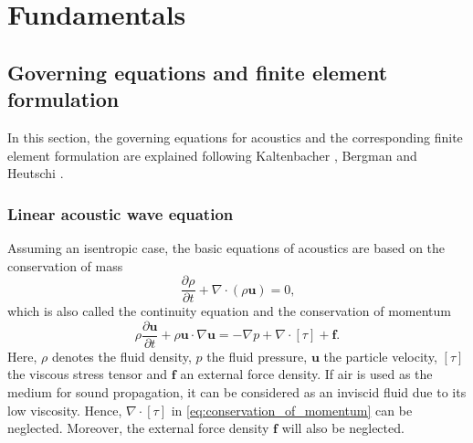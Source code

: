 \chapter{Fundamentals}
\label{chap:Theory}

\section{Governing equations and finite element formulation}

In this section, the governing equations for acoustics and the corresponding finite element formulation are explained following Kaltenbacher \cite{kaltenbacher_numerical_2007, kaltenbacher_computational_2018}, Bergman \cite{bergman_computational_2018} and Heutschi \cite{heutschi_lecture_2016}. %

\subsection*{Linear acoustic wave equation}
 Assuming an isentropic case, the basic equations of acoustics are based on the conservation of mass
\begin{equation}
	\frac{\partial \rho}{\partial t} + \nabla \cdot (\rho \boldsymbol{u}) = 0\text{,} \label{eq:conservation_of_mass}
\end{equation}
which is also called the continuity equation and the conservation of momentum
\begin{equation}
	\rho\frac{\partial \boldsymbol{u}}{\partial t} + \rho \boldsymbol{u}\cdot\nabla\boldsymbol{u} = -\nabla p + \nabla\cdot\left[\tau\right] + \boldsymbol{f}\text{.} \label{eq:conservation_of_momentum}
\end{equation}
Here, $\rho$ denotes the fluid density, $p$ the fluid pressure, $\boldsymbol{u}$ the particle velocity, $\left[\tau\right]$ the viscous stress tensor and $\boldsymbol{f}$ an external force density. If air is used as the medium for sound propagation, it can be considered as an inviscid fluid due to its low viscosity. Hence, $\nabla\cdot\left[\tau\right]$ in \cref{eq:conservation_of_momentum} can be neglected. Moreover, the external force density $\boldsymbol{f}$ will also be neglected.

